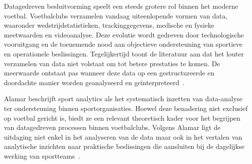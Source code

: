 


Datagedreven besluitvorming speelt een steeds grotere rol binnen het moderne voetbal.
Voetbalclubs verzamelen vandaag uiteenlopende vormen van data, waaronder wedstrijdstatistieken, trackinggegevens, medische en fysieke meetwaarden en videoanalyse.
Deze evolutie wordt gedreven door technologische vooruitgang en de toenemende nood aan objectieve ondersteuning van sportieve en operationele beslissingen.
Tegelijkertijd toont de literatuur aan dat het louter verzamelen van data niet volstaat om tot betere prestaties te komen. 
De meerwaarde ontstaat pas wanneer deze data op een gestructureerde en doordachte manier worden geanalyseerd en geïnterpreteerd~\autocite{Alamar2013}.

Alamar beschrijft sport analytics als het systematisch inzetten van data-analyse ter ondersteuning binnen sportorganisaties.
Hoewel deze benadering niet exclusief op voetbal gericht is, biedt ze een relevant theoretisch kader voor het begrijpen van datagedreven processen binnen voetbalclubs.
Volgens Alamar ligt de uitdaging niet enkel in het analyseren van de data maar ook in het vertalen van analytische inzichten naar praktische beslissingen die aansluiten bij de dagelijkse werking van sportteams~\autocite{Alamar2013}.

